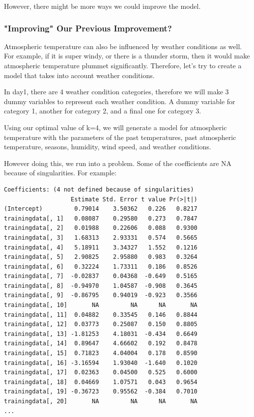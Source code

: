 \documentclass[12pt]{article}
\begin{document}
However, there might be more ways we could improve the model.

\subsubsection{"Improving" Our Previous Improvement?}
Atmospheric temperature can also be influenced by weather conditions as well. For example, if it is super windy, or there is a thunder storm, then it would make atmospheric temperature plummet significantly. Therefore, let's try to create a model that takes into account weather conditions.

In day1, there are 4 weather condition categories, therefore we will make 3 dummy variables to represent each weather condition. A dummy variable for category 1, another for category 2, and a final one for category 3.

Using our optimal value of k=4, we will generate a model for atmospheric temperature with the parameters of the past temperatures, past atmospheric temperature, seasons, humidity, wind speed, and weather conditions.

However doing this, we run into a problem. Some of the coefficients are NA because of singularities. For example:
\begin{verbatim}
Coefficients: (4 not defined because of singularities)
                   Estimate Std. Error t value Pr(>|t|)    
(Intercept)         0.79014    3.50362   0.226   0.8217    
trainingdata[, 1]   0.08087    0.29580   0.273   0.7847    
trainingdata[, 2]   0.01988    0.22606   0.088   0.9300    
trainingdata[, 3]   1.68313    2.93331   0.574   0.5665    
trainingdata[, 4]   5.18911    3.34327   1.552   0.1216    
trainingdata[, 5]   2.90825    2.95880   0.983   0.3264    
trainingdata[, 6]   0.32224    1.73311   0.186   0.8526    
trainingdata[, 7]  -0.02837    0.04368  -0.649   0.5165    
trainingdata[, 8]  -0.94970    1.04587  -0.908   0.3645    
trainingdata[, 9]  -0.86795    0.94019  -0.923   0.3566    
trainingdata[, 10]       NA         NA      NA       NA    
trainingdata[, 11]  0.04882    0.33545   0.146   0.8844    
trainingdata[, 12]  0.03773    0.25087   0.150   0.8805    
trainingdata[, 13] -1.81253    4.18031  -0.434   0.6649    
trainingdata[, 14]  0.89647    4.66602   0.192   0.8478    
trainingdata[, 15]  0.71823    4.04004   0.178   0.8590    
trainingdata[, 16] -3.16594    1.93040  -1.640   0.1020    
trainingdata[, 17]  0.02363    0.04500   0.525   0.6000    
trainingdata[, 18]  0.04669    1.07571   0.043   0.9654    
trainingdata[, 19] -0.36723    0.95562  -0.384   0.7010    
trainingdata[, 20]       NA         NA      NA       NA    
...
\end{verbatim}
\end{document}
